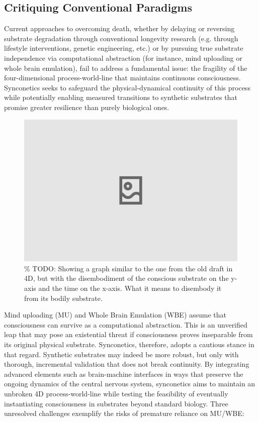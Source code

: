 \documentclass[10pt]{article}
\begin{document}
\begin{sloppypar}
  \subsection{Critiquing Conventional Paradigms}
  \label{sec:new-paradigm}

  Current approaches to overcoming death, whether by delaying or reversing substrate degradation through conventional longevity research (e.g. through lifestyle interventions, genetic engineering, etc.) or by pursuing true substrate independence via computational abstraction (for instance, mind uploading or whole brain emulation), fail to address a fundamental issue: the fragility of the four-dimensional process-world-line that maintains continuous consciousness. Synconetics seeks to safeguard the physical-dynamical continuity of this process while potentially enabling measured transitions to synthetic substrates that promise greater resilience than purely biological ones.

  \begin{figure}[ht!]
    \centering
    \includegraphics[width=\textwidth]{figures/4d-trajectory-disembodiment.png}
    \caption{\% TODO: Showing a graph similar to the one from the old draft in 4D, but with the disembodiment of the conscious substrate on the y-axis and the time on the x-axis. What it means to disembody it from its bodily substrate.}
    \label{fig:4d-trajectory-disembodiment}
  \end{figure}

  Mind uploading (MU) and Whole Brain Emulation (WBE) assume that consciousness can survive as a computational abstraction. This is an unverified leap that may pose an existential threat if consciousness proves inseparable from its original physical substrate. Synconetics, therefore, adopts a cautious stance in that regard. Synthetic substrates may indeed be more robust, but only with thorough, incremental validation that does not break continuity. By integrating advanced elements such as brain-machine interfaces in ways that preserve the ongoing dynamics of the central nervous system, synconetics aims to maintain an unbroken 4D process-world-line while testing the feasibility of eventually instantiating consciousness in substrates beyond standard biology. Three unresolved challenges exemplify the risks of premature reliance on MU/WBE:


\end{sloppypar}
\end{document}
